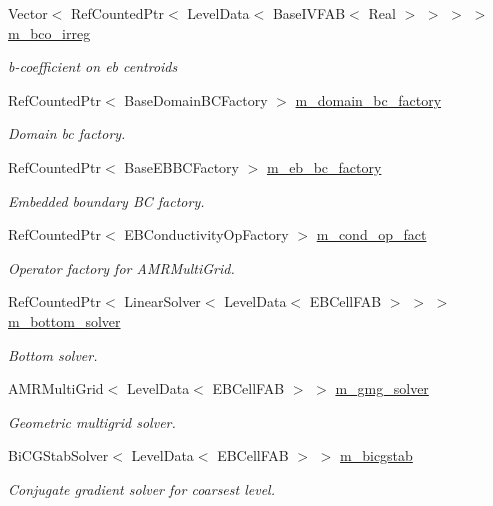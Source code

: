 \begin{DoxyCompactItemize}
Vector$<$ Ref\+Counted\+Ptr$<$ Level\+Data$<$ Base\+I\+V\+F\+AB$<$ Real $>$ $>$ $>$ $>$ \hyperlink{classpoisson__staircase__gmg_a6c24e1d569a22ce6114b94261ca1b017}{m\+\_\+bco\+\_\+irreg}
\begin{DoxyCompactList}\small\item\em b-\/coefficient on eb centroids \end{DoxyCompactList}\item 
Ref\+Counted\+Ptr$<$ Base\+Domain\+B\+C\+Factory $>$ \hyperlink{classpoisson__staircase__gmg_ad41c6e5a1c27a79ab4c843032951e21b}{m\+\_\+domain\+\_\+bc\+\_\+factory}
\begin{DoxyCompactList}\small\item\em Domain bc factory. \end{DoxyCompactList}\item 
Ref\+Counted\+Ptr$<$ Base\+E\+B\+B\+C\+Factory $>$ \hyperlink{classpoisson__staircase__gmg_a842d2c9d88838b82c44d6bda6cce4e98}{m\+\_\+eb\+\_\+bc\+\_\+factory}
\begin{DoxyCompactList}\small\item\em Embedded boundary BC factory. \end{DoxyCompactList}\item 
Ref\+Counted\+Ptr$<$ E\+B\+Conductivity\+Op\+Factory $>$ \hyperlink{classpoisson__staircase__gmg_ab6d3d107ddcc3afea9e798b9cc1aecd8}{m\+\_\+cond\+\_\+op\+\_\+fact}
\begin{DoxyCompactList}\small\item\em Operator factory for A\+M\+R\+Multi\+Grid. \end{DoxyCompactList}\item 
Ref\+Counted\+Ptr$<$ Linear\+Solver$<$ Level\+Data$<$ E\+B\+Cell\+F\+AB $>$ $>$ $>$ \hyperlink{classpoisson__staircase__gmg_a90c313cc0603bbad78492a6d20853cd5}{m\+\_\+bottom\+\_\+solver}
\begin{DoxyCompactList}\small\item\em Bottom solver. \end{DoxyCompactList}\item 
A\+M\+R\+Multi\+Grid$<$ Level\+Data$<$ E\+B\+Cell\+F\+AB $>$ $>$ \hyperlink{classpoisson__staircase__gmg_a324f584aa293a111287561d4e0287cca}{m\+\_\+gmg\+\_\+solver}
\begin{DoxyCompactList}\small\item\em Geometric multigrid solver. \end{DoxyCompactList}\item 
Bi\+C\+G\+Stab\+Solver$<$ Level\+Data$<$ E\+B\+Cell\+F\+AB $>$ $>$ \hyperlink{classpoisson__staircase__gmg_aeee3ab11fb84f1bf675bf40af8ba748d}{m\+\_\+bicgstab}
\begin{DoxyCompactList}\small\item\em Conjugate gradient solver for coarsest level. \end{DoxyCompactList}\end{DoxyCompactItemize}


